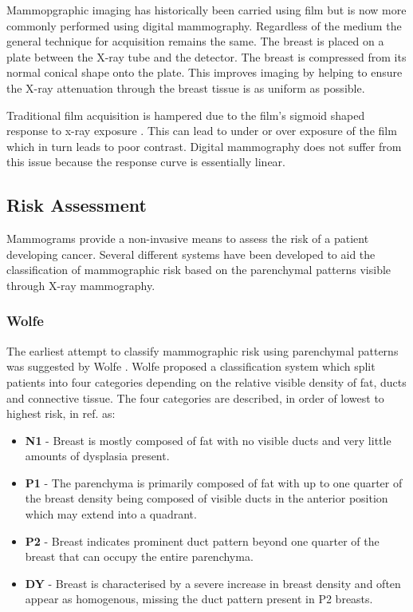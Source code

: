 Mammopgraphic imaging has historically been carried using film but is now more commonly performed using digital mammography. Regardless of the medium the general technique for acquisition remains the same. The breast is placed on a plate between the X-ray tube and the detector. The breast is compressed from its normal conical shape onto the plate. This improves imaging by helping to ensure the X-ray attenuation through the breast tissue is as uniform as possible. 

Traditional film acquisition is hampered due to the film's sigmoid shaped response to x-ray exposure \cite{kopans1998breast}. This can lead to under or over exposure of the film which in turn leads to poor contrast. Digital mammography does not suffer from this issue because the response curve is essentially linear.


\subsection{Risk Assessment}
Mammograms provide a non-invasive means to assess the risk of a patient developing cancer. Several different systems have been developed to aid the classification of mammographic risk based on the parenchymal patterns visible through X-ray mammography.

\subsubsection{Wolfe}
The earliest attempt to classify mammographic risk using parenchymal patterns was suggested by Wolfe \cite{wolfe1976breast}. Wolfe proposed a classification system which split patients into four categories depending on the relative visible density of fat, ducts and connective tissue. The four categories are described, in order of lowest to highest risk, in ref. \cite{wolfe1976breast} as:

\begin{itemize}
	\item \textbf{N1} - Breast is mostly composed of fat with no visible ducts and very little amounts of dysplasia present. 
	\item \textbf{P1} - The parenchyma is primarily composed of fat with up to one quarter of the breast density being composed of visible ducts in the anterior position which may extend into a quadrant.
	\item \textbf{P2} - Breast indicates prominent duct pattern beyond one quarter of the breast that can occupy the entire parenchyma.
	\item \textbf{DY} - Breast is characterised by a severe increase in breast density and often appear as homogenous, missing the duct pattern present in P2 breasts.
\end{itemize}

